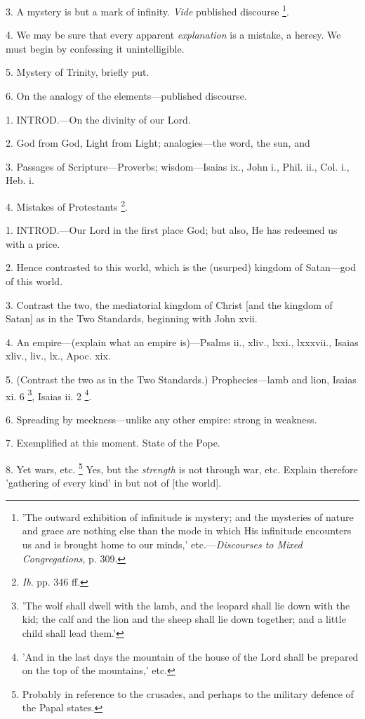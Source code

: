 3. A mystery is but a mark of infinity. \emph{Vide}
published discourse \footnote{'The outward exhibition
of infinitude is mystery; and the mysteries of nature and grace are
nothing else than the mode in which His infinitude encounters us and
is brought home to our minds,' etc.—\emph{Discourses to Mixed
Congregations}, p. 309.}.

4. We may be sure that every apparent \emph{explanation}
is a mistake, a heresy. We must begin by confessing it unintelligible.

5. Mystery of Trinity, briefly put.

6. On the analogy of the elements—published
discourse.


1. INTROD.—On
the divinity of our Lord.

2. God from God, Light from Light;
analogies—the word, the sun, and

3. Passages of Scripture—Proverbs; wisdom—Isaias
ix., John i., Phil. ii., Col. i., Heb. i.

4. Mistakes of Protestants \footnote{\emph{Ib}. pp. 346 ff.}.


1. INTROD.—Our
Lord in the first place God; but also, He has redeemed us with a
price.

2. Hence contrasted to this world, which is the
(usurped) kingdom of Satan—god of this world.

3. Contrast the two, the mediatorial kingdom of
Christ [and the kingdom of Satan] as in the Two Standards, beginning
with John xvii.

4. An empire—(explain what an empire
is)—Psalms ii., xliv., lxxi., lxxxvii., Isaias xliv., liv., lx.,
Apoc. xix.

5. (Contrast the two as in the Two Standards.)
Prophecies—lamb and lion, Isaias xi. 6 \footnote{'The wolf shall dwell
with the lamb, and the leopard shall lie down with the kid; the calf
and the lion and the sheep shall lie down together; and a little child
shall lead them.'}, Isaias ii. 2 \footnote{'And in the last days
the mountain of the house of the Lord shall be prepared on the top of
the mountains,' etc.}.

6. Spreading by meekness—unlike any other
empire: strong in weakness.

7. Exemplified at this moment. State of the Pope.

8. Yet wars, etc. \footnote{Probably in reference to
the crusades, and perhaps to the military defence of the Papal states.} Yes, but the \emph{strength} is not through war, etc. Explain
therefore 'gathering of every kind' in but not of [the world].

